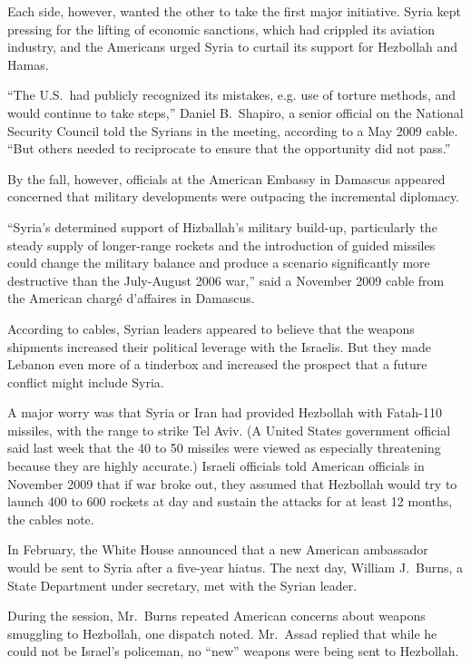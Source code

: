 ﻿\documentclass[12pt]{article}
\begin{document}
Each side, however, wanted the other to take the first major initiative. Syria kept pressing for the
lifting of economic sanctions, which had crippled its aviation industry, and the Americans urged
Syria to curtail its support for Hezbollah and Hamas.

``The U.S.~had publicly recognized its mistakes, e.g. use of torture methods, and would continue to
take steps,'' Daniel B.~Shapiro, a senior official on the National Security Council told the Syrians
in the meeting, according to a May 2009 cable. ``But others needed to reciprocate to ensure that the
opportunity did not pass.''

By the fall, however, officials at the American Embassy in Damascus appeared concerned that military
developments were outpacing the incremental diplomacy.

``Syria's determined support of Hizballah's military build-up, particularly the steady supply of
longer-range rockets and the introduction of guided missiles could change the military balance and
produce a scenario significantly more destructive than the July-August 2006 war,'' said a November
2009 cable from the American charg\'e d'affaires in Damascus.

According to cables, Syrian leaders appeared to believe that the weapons shipments increased their
political leverage with the Israelis. But they made Lebanon even more of a tinderbox and increased
the prospect that a future conflict might include Syria.

A major worry was that Syria or Iran had provided Hezbollah with Fatah-110 missiles, with the range
to strike Tel Aviv. (A United States government official said last week that the 40 to 50 missiles
were viewed as especially threatening because they are highly accurate.) Israeli officials told
American officials in November 2009 that if war broke out, they assumed that Hezbollah would try to
launch 400 to 600 rockets at day and sustain the attacks for at least 12 months, the cables note.

In February, the White House announced that a new American ambassador would be sent to Syria after a
five-year hiatus. The next day, William J.~Burns, a State Department under secretary, met with the
Syrian leader.

During the session, Mr.~Burns repeated American concerns about weapons smuggling to Hezbollah, one
dispatch noted. Mr.~Assad replied that while he could not be Israel's policeman, no ``new'' weapons
were being sent to Hezbollah.
\end{document}
